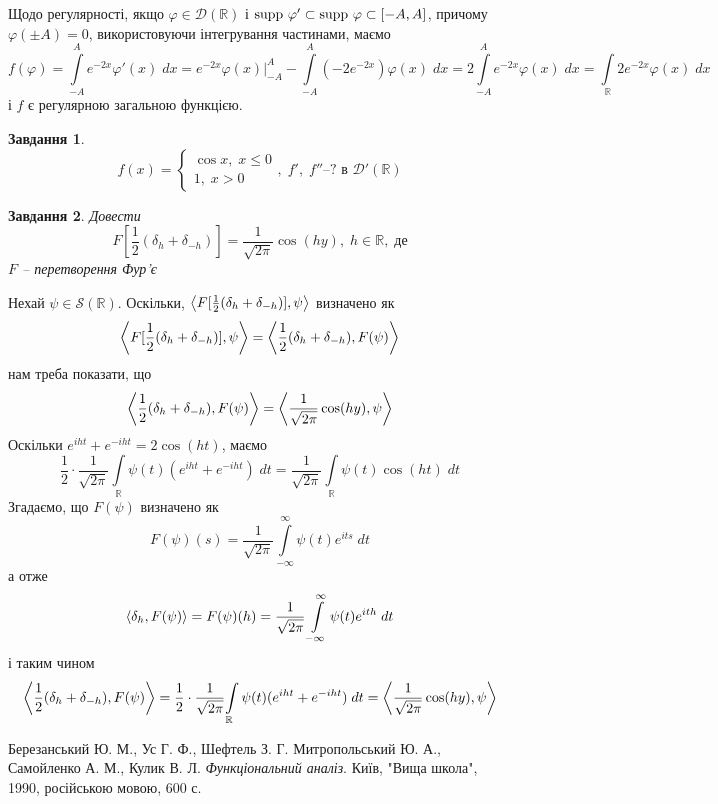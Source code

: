 \documentclass[10pt]{article}
\newtheorem{prob}{Завдання}
\newcommand{\dt}{\;dt}
\newcommand{\dx}{\;dx}
\let\oldint\int
\renewcommand{\int}{\oldint\limits}
\let\phi\varphi
\begin{document}
Щодо регулярності, якщо $\phi\in\mathcal{D}(\mathbb{R})$ і $\supp\phi'\subset\supp\phi\subset[-A,A]$, причому $\phi(\pm A)=0$, використовуючи
інтегрування частинами, маємо
\[f(\phi)=\int_{-A}^Ae^{-2x}\phi'(x)\dx=e^{-2x}\phi(x)\bigg|_{-A}^A-\int_{-A}^A(-2e^{-2x})\phi(x)\dx=2\int_{-A}^Ae^{-2x}\phi(x)\dx=
\int_\mathbb{R}2e^{-2x}\phi(x)\dx\]
і $f$ є регулярною загальною функцією.
\begin{prob}
	\[f(x)=\left\{\begin{array}{ll}\cos x,\;x\leq0\\1,\;x>0\end{array}\right.,\;\mbox{$f',\;f''$--?{ в }$\mathcal{D}'(\mathbb{R})$}\]
\end{prob}
\begin{prob}
	Довести
	\[F[\frac{1}{2}(\delta_h+\delta_{-h})]=\frac{1}{\sqrt{2\pi}}\cos(hy),\;h\in\mathbb{R},\;\mbox{де}\]
	$F$ -- перетворення Фур’є
\end{prob}
Нехай $\psi\in\mathcal{S}(\mathbb{R})$. Оскільки, $\left<F[\frac{1}{2}(\delta_h+\delta_{-h})],\psi\right>$ визначено як
\[\left<F[\frac{1}{2}(\delta_h+\delta_{-h})],\psi\right>=\left<\frac{1}{2}(\delta_h+\delta_{-h}),F(\psi)\right>\]
нам треба показати, що
\[\left<\frac{1}{2}(\delta_h+\delta_{-h}),F(\psi)\right>=\left<\frac{1}{\sqrt{2\pi}}\cos(hy),\psi\right>\]
Оскільки $e^{iht}+e^{-iht}=2\cos(ht)$, маємо
\[\frac{1}{2}\cdot\frac{1}{\sqrt{2\pi}}{\int_{\mathbb{R}}\psi(t)(e^{iht}+e^{-iht})\dt}=\frac{1}{\sqrt{2\pi}}\int_{\mathbb{R}}\psi(t)
\cos(ht)\dt\]
Згадаємо, що $F(\psi)$ визначено як
\[F(\psi)(s)=\frac{1}{\sqrt{2\pi}}\int_{-\infty}^\infty \psi(t)e^{its}\dt\]
а отже
\[\myabra{\delta_h,F(\psi)}=F(\psi)(h)=\frac{1}{\sqrt{2\pi}}\int_{-\infty}^\infty \psi(t)e^{ith}\dt\]
і таким чином
\[\myabra{\frac{1}{2}(\delta_h+\delta_{-h}),F(\psi)}=\frac{1}{2}\cdot\frac{1}{\sqrt{2\pi}}{\int_{\mathbb{R}}\psi(t)(e^{iht}+e^{-iht})\dt
}=
\myabra{\frac{1}{\sqrt{2\pi}}\cos(hy),\psi}\]
\begin{thebibliography}{9}
Березанський Ю. М., Ус Г. Ф., Шефтель З. Г.
Митропольський Ю. А., Самойленко А. М., Кулик В. Л.
\emph{Функціональний аналіз}.
Київ, "Вища школа"{}, 1990, російською мовою, 600 с.
\end{thebibliography}
\end{document}
